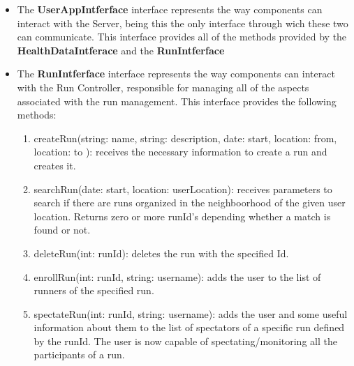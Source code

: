 \documentclass[12pt]{article}
\begin{document}
\begin{itemize}
    \item The \textbf{UserAppIntferface} interface represents the way components can interact with the Server, being this the only interface through wich these two can communicate. This interface provides all of the methods provided by the \textbf{HealthDataIntferace} and the \textbf{RunIntferface}
    \item The \textbf{RunIntferface} interface represents the way components can interact with the Run Controller, responsible for managing all of the aspects associated with the run management. This interface provides the following methods: 
    \begin{enumerate}
        \item createRun(string: name, string: description, date: start, location: from, location: to ): receives the necessary information to create a run and creates it. 
        \item searchRun(date: start, location: userLocation): receives parameters to search if there are runs organized in the neighboorhood of the given user location. Returns zero or more runId's depending whether a match is found or not.
        \item deleteRun(int: runId): deletes the run with the specified Id. 
        \item enrollRun(int: runId, string: username): adds the user to the list of runners of the specified run.
        \item spectateRun(int: runId, string: username): adds the user and some useful information about them to the list of spectators of a specific run defined by the runId. The user is now capable of spectating/monitoring all the participants of a run.
    \end{enumerate}
    

\end{itemize}
\end{document}
